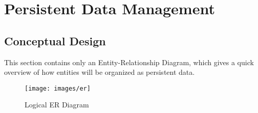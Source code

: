\chapter{Persistent Data Management}

	\section{Conceptual Design}
	This section contains only an Entity-Relationship Diagram, which gives a quick overview of how entities will be organized as persistent data.


\newpage
	\begin{figure}[H]
		\centering
		\texttt{[image: images/er]}
		\caption{Logical ER Diagram}
		\label{fig:er}
	\end{figure}